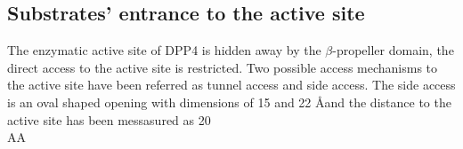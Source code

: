 \subsection{Substrates' entrance to the active site}

The enzymatic active site of DPP4 is hidden away by the $\beta$-propeller domain, the direct access to the active site is restricted. Two possible access mechanisms to the active site have been referred as tunnel access and side access. The side access is an oval shaped opening with dimensions of 15 and 22 \AA and the distance to the active site has been messasured as 20 \\AA